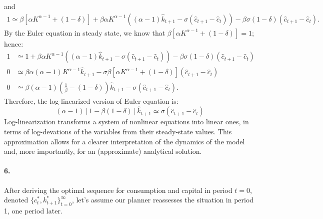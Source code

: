 \documentclass[dvipsnames,11pt]{article}
\begin{document}
\begin{solution}
and
\begin{align*}
    1\simeq \beta[\alpha K^{\alpha-1}+(1-\delta)]+\beta \alpha K^{\alpha-1}((\alpha-1)\hat k_{t+1}-\sigma(\hat c_{t+1}-\hat c_t))-\beta\sigma(1-\delta)(\hat c_{t+1}-\hat c_t).
\end{align*}
By the Euler equation in steady state, we know that $\beta[\alpha K^{\alpha-1}+(1-\delta)]=1$; hence:
\begin{align*}
    1&\simeq 1+\beta \alpha K^{\alpha-1}((\alpha-1)\hat k_{t+1}-\sigma(\hat c_{t+1}-\hat c_t))-\beta\sigma(1-\delta)(\hat c_{t+1}-\hat c_t) \\
    0 &\simeq \beta \alpha (\alpha-1)K^{\alpha-1}\hat k_{t+1}-\sigma \beta[\alpha K^{\alpha-1}+(1-\delta)](\hat c_{t+1}-\hat c_t)\\
    0 &\simeq \beta(\alpha-1)\left(\frac{1}{\beta}-(1-\delta)\right) \hat k_{t+1}-\sigma(\hat c_{t+1}-\hat c_t).
\end{align*}
Therefore, the log-linearized version of Euler equation is:
\begin{equation*}
    (\alpha-1)[1-\beta(1-\delta)]\hat k_{t+1} \simeq \sigma(\hat c_{t+1}-\hat c_t)
\end{equation*}
Log-linearization transforms a system of nonlinear equations into linear ones, in terms of log-devations of the variables from their steady-state values. This approximation allows for a clearer interpretation of the dynamics of the model and, more importantly, for an (approximate) analytical solution.\end{solution}

\paragraph{6.} After deriving the optimal sequence for consumption and capital in period $t = 0$, denoted $\{c_t^*, k_{t+1}^*\}_{t=0}^\infty$, let's assume our planner reassesses the situation in period 1, one period later. 
\end{document}
